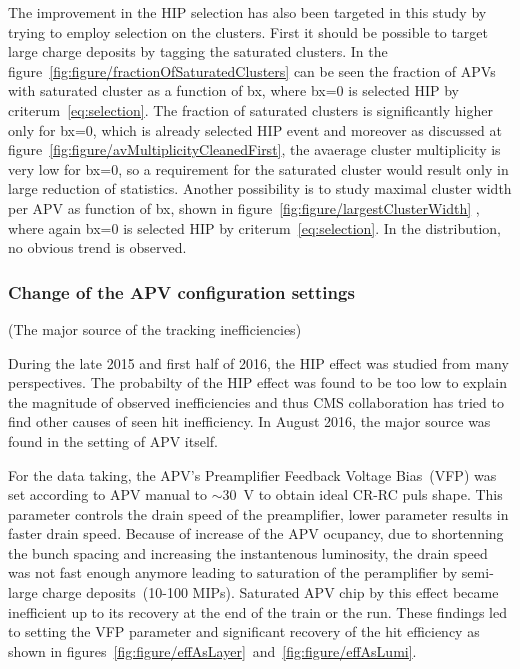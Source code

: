 The improvement in the HIP selection has also been targeted in this study by trying to employ selection on the clusters. First it should be possible to target large charge deposits by tagging the saturated clusters. In the figure~\ref{fig:figure/fractionOfSaturatedClusters} can be  seen the fraction of APVs with saturated cluster as a function of bx, where bx=0 is selected HIP by criterum~\ref{eq:selection}. The fraction of saturated clusters is significantly higher only for bx=0, which is already selected HIP event and moreover as discussed at figure~\ref{fig:figure/avMultiplicityCleanedFirst}, the avaerage cluster multiplicity is very low for bx=0, so a requirement for the saturated cluster would result only in large reduction of statistics. Another possibility is to study maximal cluster width per APV as function of bx, shown in figure~\ref{fig:figure/largestClusterWidth} , where again bx=0 is selected HIP by criterum~\ref{eq:selection}. In the distribution, no obvious trend is observed. 



\subsubsection{Change of the APV configuration settings}
          (The major source of the tracking inefficiencies)

During the late 2015 and first half of 2016, the HIP effect was studied from many perspectives. The probabilty of the HIP effect was found to be too low to explain the magnitude of observed inefficiencies and thus CMS collaboration has tried to find other causes of seen hit inefficiency. In August 2016, the major source was found in the setting of APV itself.

For the data taking, the APV's Preamplifier Feedback Voltage Bias~(VFP) was set according to APV manual to $\sim$30~V to obtain ideal CR-RC puls shape. This parameter controls the drain speed of the preamplifier, lower parameter results in faster drain speed. Because of increase of the APV ocupancy, due to shortenning the bunch spacing and increasing the instantenous luminosity, the drain speed was not fast enough anymore leading to saturation of the peramplifier by semi-large charge deposits~(10-100 MIPs). Saturated APV chip by this effect became inefficient up to its recovery at the end of the train or the run. These findings led to setting the VFP parameter and significant recovery of the hit efficiency as shown in figures~\ref{fig:figure/effAsLayer}~and~\ref{fig:figure/effAsLumi}.

